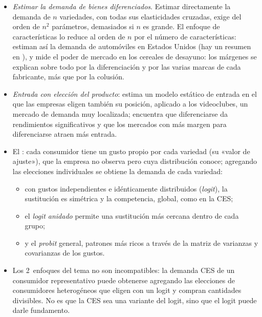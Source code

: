 \documentclass[11pt]{article}
\begin{document}
\begin{itemize}
\item \emph{Estimar la demanda de bienes diferenciados}. Estimar directamente la demanda de $n$ variedades, con todas sus elasticidades cruzadas, exige del orden de $n^2$ parámetros, demasiados si $n$ es grande. El enfoque de características lo reduce al orden de $n$ por el número de características: \textcite{BerryLevinsohnPakes1995Automobile} estiman así la demanda de automóviles en Estados Unidos (hay un resumen en \textcite[211-212]{Cabral2000Introduction}), y \textcite{Nevo2001Measuring} mide el poder de mercado en los cereales de desayuno: los márgenes se explican sobre todo por la diferenciación y por las varias marcas de cada fabricante, más que por la colusión.
\item \emph{Entrada con elección del producto}: \textcite{Seim2006Empirical} estima un modelo estático de entrada en el que las empresas eligen también su posición, aplicado a los videoclubes, un mercado de demanda muy localizada; encuentra que diferenciarse da rendimientos significativos y que los mercados con más margen para diferenciarse atraen más entrada.
\item El : cada consumidor tiene un gusto propio por cada variedad (su «valor de ajuste»), que la empresa no observa pero cuya distribución conoce; agregando las elecciones individuales se obtiene la demanda de cada variedad\nocite{AndersonDePalmaThisse1992Discrete}:
  \begin{itemize}
  \item con gustos independientes e idénticamente distribuidos (\emph{logit}), la sustitución es simétrica y la competencia, global, como en la CES;
  \item el \emph{logit anidado} permite una sustitución más cercana dentro de cada grupo;
  \item y el \emph{probit} general, patrones más ricos a través de la matriz de varianzas y covarianzas de los gustos.
  \end{itemize}
\item Los 2~enfoques del tema no son incompatibles: la demanda CES de un consumidor representativo puede obtenerse agregando las elecciones de consumidores heterogéneos que eligen con un logit y compran cantidades divisibles\nocite{AndersonDePalmaThisse1992Discrete}. No es que la CES sea una variante del logit, sino que el logit puede darle fundamento.
\end{itemize}
\end{document}
